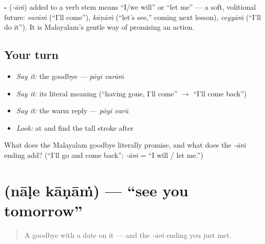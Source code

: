 \begin{grammarlens}[title={Grammar Lens: the -\ml{ആം} ending, \textquotedblleft{}let me / I will\textquotedblright{}}]
\textbf{-} (\emph{-āṁ}) added to a verb stem means \textquotedblleft{}I/we will\textquotedblright{} or \textquotedblleft{}let me\textquotedblright{} — a soft, volitional future: \emph{varāṁ} (\textquotedblleft{}I'll come\textquotedblright{}), \emph{kāṇāṁ} (\textquotedblleft{}let's see,\textquotedblright{} coming next lesson), \emph{ceyyāṁ} (\textquotedblleft{}I'll do it\textquotedblright{}). It is Malayalam's gentle way of promising an action.
\end{grammarlens}

\subsection*{Your turn}
\begin{itemize}
\raggedright
  \item \emph{Say it:} the goodbye — \emph{pōyi varāṁ}
  \item \emph{Say it:} its literal meaning (\textquotedblleft{}having gone, I'll come\textquotedblright{} $\to$ \textquotedblleft{}I'll come back\textquotedblright{})
  \item \emph{Say it:} the warm reply — \emph{pōyi varū}
  \item \emph{Look:} at  and find the tall  stroke after 
\end{itemize}

\begin{tcolorbox}[breakable,colback=teal!4,colframe=teal!35!black,title={Before you move on}]
What does the Malayalam goodbye literally promise, and what does the \emph{-āṁ} ending add? (\textquotedblleft{}I'll go and come back\textquotedblright{}; \emph{-āṁ} = \textquotedblleft{}I will / let me.\textquotedblright{})
\end{tcolorbox}
\section[\texorpdfstring{\ml{നാളെ} \ml{കാണാം} (nāḷe kāṇāṁ)}{നാളെ കാണാം (nāḷe kāṇāṁ)}]{  (nāḷe kāṇāṁ) — \textquotedblleft{}see you tomorrow\textquotedblright{}}

\label{lesson:ML-C04-naale-kaanaam}



\begin{quote}
A goodbye with a date on it — and the \emph{-āṁ} ending you just met.
\end{quote}

